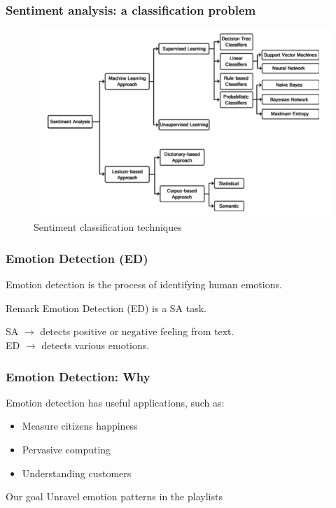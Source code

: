 \documentclass[xcolor=dvipsnames]{beamer}
\begin{document}
\begin{frame}
\frametitle{Sentiment analysis: a classification problem}
\begin{figure}
	\centering
	\includegraphics[scale=0.4]{./images/sentiment_classification}
	\caption{Sentiment classification techniques}
\end{figure}
\end{frame}

\begin{frame}
\frametitle{Emotion Detection (ED)}
\begin{definition}
Emotion detection is the process of identifying human emotions.
\end{definition}
\begin{block}{Remark}
Emotion Detection (ED) is a SA task.
\end{block}
SA  $\rightarrow$ detects positive or negative feeling from text.\\
ED  $\rightarrow$ detects various emotions.\\
\end{frame}

\begin{frame}
\frametitle{Emotion Detection: Why}
Emotion detection has useful applications, such as: 
\begin{itemize}
\item Measure citizens happiness
\item Pervasive computing
\item Understanding customers
\end{itemize}
\begin{block}{Our goal}
Unravel emotion patterns in the playlists
\end{block}
\end{frame}
\end{document}
